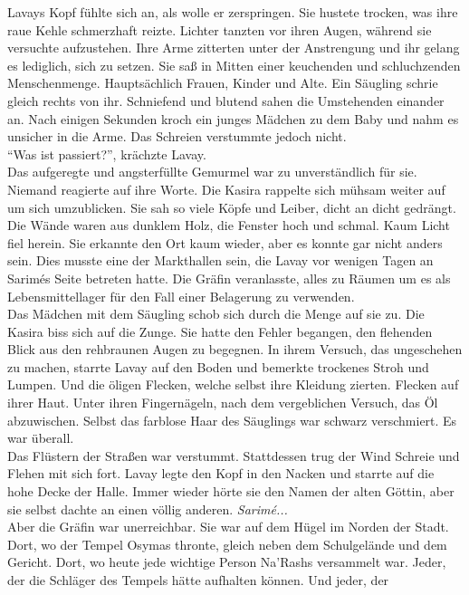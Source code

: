 Lavays Kopf fühlte sich an, als wolle er zerspringen. Sie hustete trocken, was ihre raue Kehle 
schmerzhaft reizte. Lichter tanzten vor ihren Augen, während sie versuchte aufzustehen. Ihre 
Arme zitterten unter der Anstrengung und ihr gelang es lediglich, sich zu setzen. Sie saß in Mitten 
einer keuchenden und schluchzenden Menschenmenge. Hauptsächlich Frauen, Kinder und Alte. Ein 
Säugling schrie gleich rechts von ihr. Schniefend und blutend sahen die Umstehenden einander an. 
Nach einigen Sekunden kroch ein junges Mädchen zu dem Baby und nahm es unsicher in die Arme. Das 
Schreien verstummte jedoch nicht.\\
``Was ist passiert?'', krächzte Lavay.\\
Das aufgeregte und angsterfüllte Gemurmel war zu unverständlich für sie. Niemand reagierte auf ihre 
Worte. Die Kasira rappelte sich mühsam weiter auf um sich umzublicken. Sie sah so viele Köpfe 
und Leiber, dicht an dicht gedrängt. Die Wände waren aus dunklem Holz, die Fenster hoch und 
schmal. Kaum Licht fiel herein. Sie erkannte den Ort kaum wieder, aber es konnte gar nicht 
anders sein. Dies musste eine der Markthallen sein, die Lavay vor wenigen Tagen an Sarimés 
Seite betreten hatte. Die Gräfin veranlasste, alles zu Räumen um es als Lebensmittellager für 
den Fall einer Belagerung zu verwenden.\\
Das Mädchen mit dem Säugling schob sich durch die Menge auf sie zu. Die Kasira biss sich auf 
die Zunge. Sie hatte den Fehler begangen, den flehenden Blick aus den rehbraunen Augen zu 
begegnen. In ihrem Versuch, das ungeschehen zu machen, starrte Lavay auf den Boden und bemerkte 
trockenes Stroh und Lumpen. Und die öligen Flecken, welche selbst ihre Kleidung zierten. Flecken 
auf ihrer Haut. Unter ihren Fingernägeln, nach dem vergeblichen Versuch, das Öl abzuwischen. 
Selbst das farblose Haar des Säuglings war schwarz verschmiert. Es war überall.\\
Das Flüstern der Straßen war verstummt. Stattdessen trug der Wind Schreie und Flehen mit sich fort. 
Lavay legte den Kopf in den Nacken und starrte auf die hohe Decke der Halle. Immer wieder hörte sie 
den Namen der alten Göttin, aber sie selbst dachte an einen völlig anderen. \textit{Sarimé...}\\
Aber die Gräfin war unerreichbar. Sie war auf dem Hügel im Norden der Stadt. Dort, wo der Tempel 
Osymas thronte, gleich neben dem Schulgelände und dem Gericht. Dort, wo heute jede wichtige Person 
Na'Rashs versammelt war. Jeder, der die Schläger des Tempels hätte aufhalten können. Und jeder, der 

